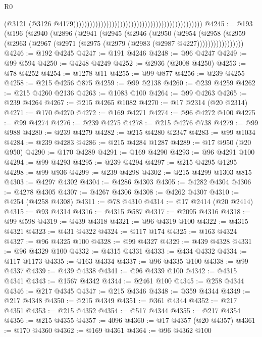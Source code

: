 \begin{lexlean}{R0}
\begin{coremodule}
                                                                                              (@3121
                                                                                                (@3126
                                                                                                  @4179)))))))))))))))))))))))))))))))))))))))))))))))
@4245 := @193
    (@196
      (@2940
        (@2896
          (@2941
            (@2945
              (@2946
                (@2950
                  (@2954
                    (@2958
                      (@2959 (@2963 (@2967 (@2971 (@2975 (@2979 (@2983 (@2987 @4227)))))))))))))))))
@4246 := @192 @4245
@4247 := @191 @4246
@4248 := @96 @4247
@4249 := @99 @594
@4250 := @4248 @4249
@4252 := @2936 (@2008 @4250)
@4253 := @78 @4252
@4254 := @1278 @11
@4255 := @99 @877
@4256 := @239 @4255
@4258 := @215 @4256 @875
@4259 := @99 @2138
@4260 := @239 @4259
@4262 := @215 @4260 @2136
@4263 := @1083 @100
@4264 := @99 @4263
@4265 := @239 @4264
@4267 := @215 @4265 @1082
@4270 := @17 @2314 (@20 @2314)
@4271 := @170 @4270
@4272 := @169 @4271
@4274 := @96 @4272 @100
@4275 := @99 @4274
@4276 := @239 @4275
@4278 := @215 @4276 @738
@4279 := @99 @988
@4280 := @239 @4279
@4282 := @215 @4280 @2347
@4283 := @99 @1034
@4284 := @239 @4283
@4286 := @215 @4284 @1287
@4289 := @17 @950 (@20 @950)
@4290 := @170 @4289
@4291 := @169 @4290
@4293 := @96 @4291 @100
@4294 := @99 @4293
@4295 := @239 @4294
@4297 := @215 @4295 @1295
@4298 := @99 @936
@4299 := @239 @4298
@4302 := @215 @4299 @1303 @815
@4303 := @4297 @4302
@4304 := @4286 @4303
@4305 := @4282 @4304
@4306 := @4278 @4305
@4307 := @4267 @4306
@4308 := @4262 @4307
@4310 := @4254 (@4258 @4308)
@4311 := @78 @4310
@4314 := @17 @2414 (@20 @2414)
@4315 := @93 @4314
@4316 := @4315 @587
@4317 := @2095 @4316
@4318 := @99 @598
@4319 := @439 @4318
@4321 := @96 @4319 @100
@4322 := @4315 @4321
@4323 := @431 @4322
@4324 := @117 @174
@4325 := @163 @4324
@4327 := @96 @4325 @100
@4328 := @99 @4327
@4329 := @439 @4328
@4331 := @96 @4329 @100
@4332 := @4315 @4331
@4333 := @434 @4332
@4334 := @117 @1173
@4335 := @163 @4334
@4337 := @96 @4335 @100
@4338 := @99 @4337
@4339 := @439 @4338
@4341 := @96 @4339 @100
@4342 := @4315 @4341
@4343 := @1567 @4342
@4344 := @2461 @100
@4345 := @258 @4344
@4346 := @217 @4345
@4347 := @215 @4346
@4348 := @359 @4344
@4349 := @217 @4348
@4350 := @215 @4349
@4351 := @361 @4344
@4352 := @217 @4351
@4353 := @215 @4352
@4354 := @517 @4344
@4355 := @217 @4354
@4356 := @215 @4355
@4357 := 4096
@4360 := @17 @4357 (@20 @4357)
@4361 := @170 @4360
@4362 := @169 @4361
@4364 := @96 @4362 @100

\end{coremodule}
\end{lexlean}
